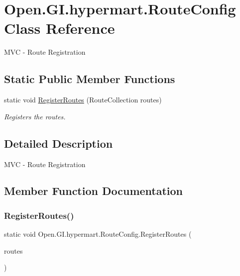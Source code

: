 \hypertarget{class_open_1_1_g_i_1_1hypermart_1_1_route_config}{}\section{Open.\+G\+I.\+hypermart.\+Route\+Config Class Reference}
\label{class_open_1_1_g_i_1_1hypermart_1_1_route_config}


M\+VC -\/ Route Registration  


\subsection*{Static Public Member Functions}
\begin{DoxyCompactItemize}
\item 
static void \hyperlink{class_open_1_1_g_i_1_1hypermart_1_1_route_config_a9b4bb82c10a972d509a88ad37cb1c783}{Register\+Routes} (Route\+Collection routes)
\begin{DoxyCompactList}\small\item\em Registers the routes. \end{DoxyCompactList}\end{DoxyCompactItemize}


\subsection{Detailed Description}
M\+VC -\/ Route Registration 



\subsection{Member Function Documentation}
\hypertarget{class_open_1_1_g_i_1_1hypermart_1_1_route_config_a9b4bb82c10a972d509a88ad37cb1c783}{}\label{class_open_1_1_g_i_1_1hypermart_1_1_route_config_a9b4bb82c10a972d509a88ad37cb1c783} 
\subsubsection{\texorpdfstring{Register\+Routes()}{RegisterRoutes()}}
{\footnotesize\ttfamily static void Open.\+G\+I.\+hypermart.\+Route\+Config.\+Register\+Routes (\begin{DoxyParamCaption}\item[{Route\+Collection}]{routes }\end{DoxyParamCaption})\hspace{0.3cm}{\ttfamily [static]}}



